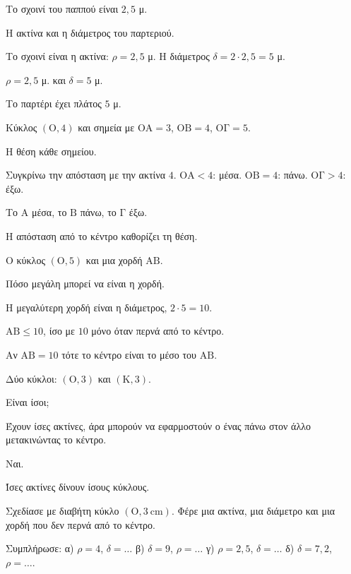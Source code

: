 
\tixero Το σχοινί του παππού είναι $2{,}5$ μ.\par
\tithelo Η ακτίνα και η διάμετρος του παρτεριού.\par
\possindeo Το σχοινί είναι η ακτίνα: $\rho=2{,}5$ μ. Η διάμετρος $\delta=2\cdot2{,}5=5$ μ.\par
\apantisi $\rho=2{,}5$ μ. και $\delta=5$ μ.\par
\elegxos Το παρτέρι έχει πλάτος $5$ μ.

\tixero Κύκλος $(\mathrm{Ο},4)$ και σημεία με $\mathrm{ΟΑ}=3$, $\mathrm{ΟΒ}=4$, $\mathrm{ΟΓ}=5$.\par
\tithelo Η θέση κάθε σημείου.\par
\possindeo Συγκρίνω την απόσταση με την ακτίνα $4$. $\mathrm{ΟΑ}<4$: μέσα. $\mathrm{ΟΒ}=4$: πάνω. $\mathrm{ΟΓ}>4$: έξω.\par
\apantisi Το $\mathrm{Α}$ μέσα, το $\mathrm{Β}$ πάνω, το $\mathrm{Γ}$ έξω.\par
\elegxos Η απόσταση από το κέντρο καθορίζει τη θέση.

\tixero Ο κύκλος $(\mathrm{Ο},5)$ και μια χορδή $\mathrm{ΑΒ}$.\par
\tithelo Πόσο μεγάλη μπορεί να είναι η χορδή.\par
\possindeo Η μεγαλύτερη χορδή είναι η διάμετρος, $2\cdot5=10$.\par
\apantisi $\mathrm{ΑΒ}\le10$, ίσο με $10$ μόνο όταν περνά από το κέντρο.\par
\elegxos Αν $\mathrm{ΑΒ}=10$ τότε το κέντρο είναι το μέσο του $\mathrm{ΑΒ}$.

\tixero Δύο κύκλοι: $(\mathrm{Ο},3)$ και $(\mathrm{Κ},3)$.\par
\tithelo Είναι ίσοι;\par
\possindeo Έχουν ίσες ακτίνες, άρα μπορούν να εφαρμοστούν ο ένας πάνω στον άλλο μετακινώντας το κέντρο.\par
\apantisi Ναι.\par
\elegxos Ίσες ακτίνες δίνουν ίσους κύκλους.



\ex Σχεδίασε με διαβήτη κύκλο $(\mathrm{Ο},3\ \mathrm{cm})$. Φέρε μια ακτίνα, μια διάμετρο και μια χορδή που δεν περνά από το κέντρο.

\ex Συμπλήρωσε: α) $\rho=4$, $\delta=\ldots$ \quad β) $\delta=9$, $\rho=\ldots$ \quad γ) $\rho=2{,}5$, $\delta=\ldots$ \quad δ) $\delta=7{,}2$, $\rho=\ldots$.

